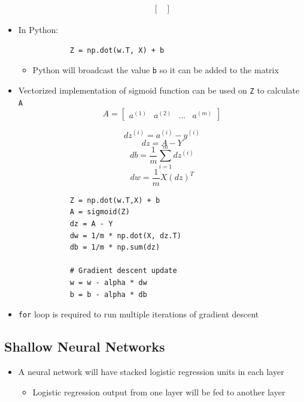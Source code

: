 \documentclass[12pt, letterpaper]{article}
\begin{document}
\begin{itemize}
\begin{align*}
\begin{bmatrix}
            \end{bmatrix}
        \end{align*}
        \item In Python:
        \begin{verbatim}
            Z = np.dot(w.T, X) + b
        \end{verbatim}
        \begin{itemize}
            \item Python will broadcast the value \texttt{b} so it can be added to the matrix
        \end{itemize}
        \item Vectorized implementation of sigmoid function can be used on \texttt{Z} to calculate \texttt{A}
        $$A= \begin{bmatrix}
            a^{(1)} & a^{(2)} & ... & a^{(m)}
        \end{bmatrix} $$
        
        $$dz^{(i)}=a^{(i)}-y^{(i)}$$
        $$dz=A-Y$$
        $$db=\frac{1}{m}\sum^m_{i=1}dz^{(i)}$$
        $$dw=\frac{1}{m}X(dz)^T$$
        \begin{verbatim}
            Z = np.dot(w.T,X) + b
            A = sigmoid(Z)
            dz = A - Y
            dw = 1/m * np.dot(X, dz.T)
            db = 1/m * np.sum(dz)

            # Gradient descent update
            w = w - alpha * dw
            b = b - alpha * db
        \end{verbatim}
        \item \texttt{for} loop is required to run multiple iterations of gradient descent
    \end{itemize}
    \subsection{Shallow Neural Networks}
    \begin{itemize}
        \item A neural network will have stacked logistic regression units in each layer
        \begin{itemize}
            \item Logistic regression output from one layer will be fed to another layer
        \end{itemize}
    \end{itemize}
\end{document}
